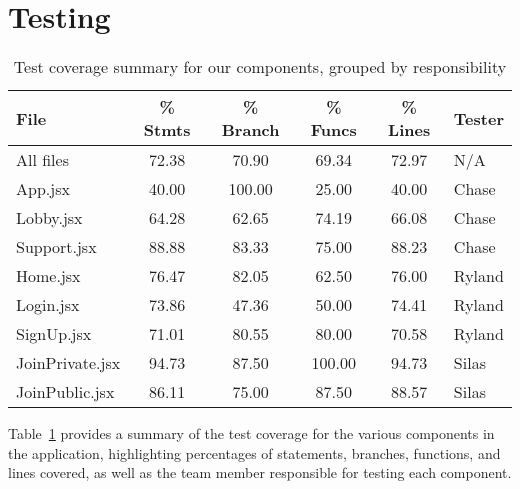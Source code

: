 \clearpage
\section{Testing}
\begin{table}[h]
\centering
\begin{tabular}{|l|c|c|c|c|l|}
\hline
\textbf{File} & \textbf{\% Stmts} & \textbf{\% Branch} & \textbf{\% Funcs} & \textbf{\% Lines} & \textbf{Tester} \\ \hline
All files                & 72.38  & 70.90  & 69.34  & 72.97  & N/A \\ \hline

\hspace{1em}App.jsx      & 40.00  & 100.00 & 25.00  & 40.00  & Chase \\ \hline
\hspace{1em}Lobby.jsx    & 64.28  & 62.65  & 74.19  & 66.08  & Chase \\ \hline
\hspace{1em}Support.jsx  & 88.88  & 83.33  & 75.00  & 88.23  & Chase \\ \hline

\hspace{1em}Home.jsx     & 76.47  & 82.05  & 62.50  & 76.00  & Ryland \\ \hline
\hspace{1em}Login.jsx    & 73.86  & 47.36  & 50.00  & 74.41  & Ryland \\ \hline
\hspace{1em}SignUp.jsx   & 71.01  & 80.55  & 80.00  & 70.58  & Ryland \\ \hline

\hspace{1em}JoinPrivate.jsx & 94.73  & 87.50  & 100.00 & 94.73 & Silas \\ \hline
\hspace{1em}JoinPublic.jsx  & 86.11  & 75.00  & 87.50  & 88.57 & Silas \\ \hline
\end{tabular}
\caption{Test coverage summary for our components, grouped by responsibility}
\label{table:test-coverage-responsibility}
\end{table}


Table~\ref{table:test-coverage-responsibility} provides a summary of the test coverage for the various components in the application, highlighting percentages of statements, branches, functions, and lines covered, as well as the team member responsible for testing each component.


